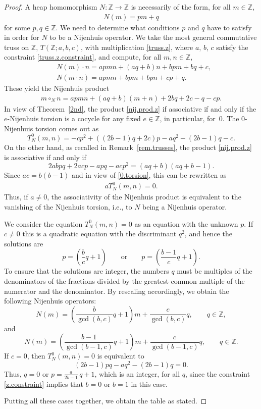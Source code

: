 \documentclass[pdftex]{sigma}
\numberwithin{equation}{section}
\newcommand{\Z}{\mathbb Z}
\begin{document}
\begin{proof}
A heap homomorphism $N\colon \Z\to \Z$ is necessarily of the form, for all $m\in \Z$,
 \begin{gather*}%
 N(m) = pm +q
 \end{gather*}
for some $p,q\in \Z$. We need to determine what conditions $p$ and $q$ have to satisfy in order for $N$ to be a Nijenhuis operator. We take the most general commutative truss on $\Z$, $T(\Z;a,b,c)$, with multiplication \eqref{truss.z}, where $a$, $b$, $c$ satisfy the constraint \eqref{truss.z.constraint}, and compute, for all $m,n\in \Z$,
\begin{align*}
 &N(m)\cdot n = apmn +(aq+b)n +bpm +bq +c,\\
 &N(m\cdot n) = apmn +bpm +bpn +cp +q.
\end{align*}
These yield the Nijenhuis product
\begin{gather}\label{nij.prod.z}
m\circ_N n = apmn + (aq+b)(m+n) +2bq +2c -q -cp.
\end{gather}
In view of Theorem~\ref{2nd}, the product \eqref{nij.prod.z} if associative if and only if the $e$-Nijenhuis torsion is a cocycle for any fixed $e\in \Z$, in particular, for~0. The $0$-Nijenhuis torsion comes out as
\begin{equation}\label{0.torsion}
 T_N^0(m,n)= -cp^2+ ((2b-1)q +2c)p - aq^2 - (2b-1)q -c.
\end{equation}
On the other hand, as recalled in Remark~\ref{rem.trusses}, the product \eqref{nij.prod.z} is associative if and only if
\begin{equation}\label{z.constraint}
 2 abpq + 2acp - apq-acp^2 = (aq+b)(aq+b-1).
\end{equation}
Since $ac=b(b-1)$ and in view of \eqref{0.torsion}, this can be rewritten as
\begin{gather*}\label{constraint}
 aT_N^0(m,n)=0.
\end{gather*}
Thus, if $a\neq 0$, the associativity of the Nijenhuis product is equivalent to the vanishing of the Nijenhuis torsion, i.e., to $N$ being a Nijenhuis operator.

We consider the equation $T_N^0(m,n)=0$ as an equation with the unknown $p$. If $c\neq 0$ this is a quadratic equation with the discriminant $q^2$, and hence the solutions are
\[
p= \left(\frac{b}{c} q +1\right)\qquad \mbox{or}\qquad p= \left(\frac{b-1}{c} q +1\right).
\]
To ensure that the solutions are integer, the numbers $q$ must be multiples of the denominators of the fractions divided by the greatest common multiple of the numerator and the denominator. By rescaling accordingly, we obtain the following Nijenhuis operators:
\[
N(m) = \left(\frac{b}{\gcd(b,c)} q +1\right)m + \frac{c}{\gcd(b,c)} q, \qquad q\in \Z,
\]
and
\[
N(m) = \left(\frac{b-1}{\gcd(b-1,c)} q +1\right)m + \frac{c}{\gcd(b-1,c)} q, \qquad q\in \Z.
\]
If $c=0$, then $T_N^0(m,n)=0$ is equivalent to
\[
(2b-1)pq - aq^2 - (2b-1)q=0.
\]
Thus, $q=0$ or $p=\frac{a}{2b-1}\, q +1$, which is an integer, for all $q$, since the constraint \eqref{z.constraint} implies that $b=0$ or $b=1$ in this case.

Putting all these cases together, we obtain the table as stated.
\end{proof}
\end{document}
